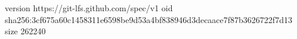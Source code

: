 version https://git-lfs.github.com/spec/v1
oid sha256:3cf675a60c1458311e6598be9d53a4bf838946d3decaace7f87b3626722f7d13
size 262240
